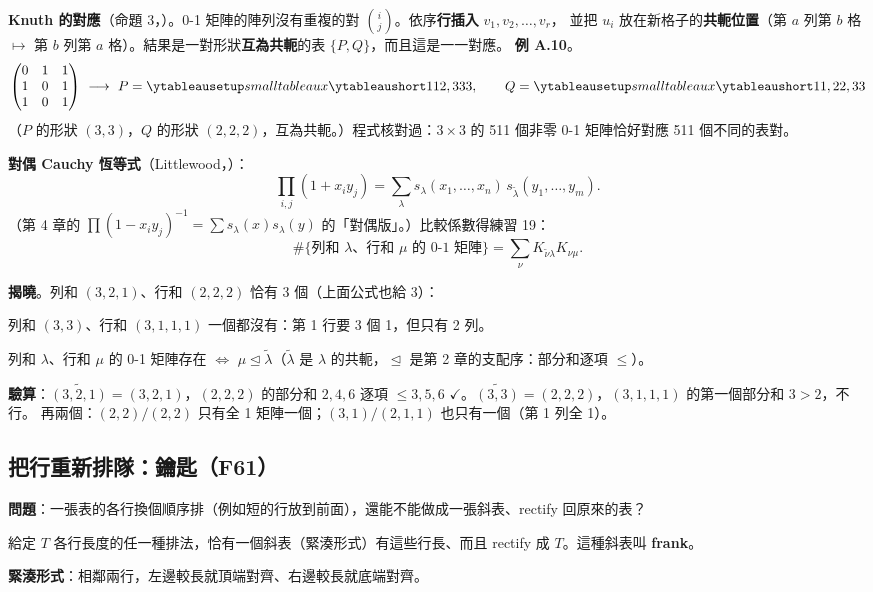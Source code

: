 \textbf{Knuth 的對應}（命題 3，）。0-1 矩陣的陣列沒有重複的對 $\binom ij$。依序\textbf{行插入} $v_1,v_2,\dots,v_r$，
並把 $u_i$ 放在新格子的\textbf{共軛位置}（第 $a$ 列第 $b$ 格 $\mapsto$ 第 $b$ 列第 $a$ 格）。結果是一對形狀\textbf{互為共軛}的表 $\{P,Q\}$，而且這是一一對應。
\textbf{例 A.10}。
\[
\begin{pmatrix}0&1&1\\1&0&1\\1&0&1\end{pmatrix}\ \longrightarrow\ P=\yts{112,333},\qquad Q=\yts{11,22,33}
\]
（$P$ 的形狀 $(3,3)$，$Q$ 的形狀 $(2,2,2)$，互為共軛。）程式核對過：$3\times3$ 的 511 個非零 0-1 矩陣恰好對應 511 個不同的表對。

\textbf{對偶 Cauchy 恆等式}（Littlewood，）：
\[
\prod_{i,j}(1+x_iy_j)=\sum_\lambda s_\lambda(x_1,\dots,x_n)\,s_{\tilde\lambda}(y_1,\dots,y_m).
\]
（第 4 章的 $\prod(1-x_iy_j)^{-1}=\sum s_\lambda(x)s_\lambda(y)$ 的「對偶版」。）比較係數得練習 19：
\[
\#\{\text{列和 }\lambda\text{、行和 }\mu\text{ 的 0-1 矩陣}\}=\sum_\nu K_{\tilde\nu\lambda}K_{\nu\mu}.
\]

\textbf{揭曉}。列和 $(3,2,1)$、行和 $(2,2,2)$ 恰有 3 個（上面公式也給 3）：
\begin{center}
\FulGaleRyser
\end{center}
列和 $(3,3)$、行和 $(3,1,1,1)$ 一個都沒有：第 1 行要 3 個 1，但只有 2 列。

\begin{thmbox}
列和 $\lambda$、行和 $\mu$ 的 0-1 矩陣存在 $\iff$ $\mu\trianglelefteq\tilde\lambda$（$\tilde\lambda$ 是 $\lambda$ 的共軛，$\trianglelefteq$ 是第 2 章的支配序：部分和逐項 $\le$）。
\end{thmbox}
\textbf{驗算}：$\widetilde{(3,2,1)}=(3,2,1)$，$(2,2,2)$ 的部分和 $2,4,6$ 逐項 $\le3,5,6$ $\checkmark$。$\widetilde{(3,3)}=(2,2,2)$，$(3,1,1,1)$ 的第一個部分和 $3>2$，不行。
再兩個：$(2,2)/(2,2)$ 只有全 1 矩陣一個；$(3,1)/(2,1,1)$ 也只有一個（第 1 列全 1）。

\subsection{把行重新排隊：鑰匙（F61）}\label{sec:f-keys}

\textbf{問題}：一張表的各行換個順序排（例如短的行放到前面），還能不能做成一張斜表、rectify 回原來的表？

\begin{thmbox}[命題 7 \fulref{p.208}]
給定 $T$ 各行長度的任一種排法，恰有一個斜表（緊湊形式）有這些行長、而且 rectify 成 $T$。這種斜表叫 \textbf{frank}。
\end{thmbox}
\textbf{緊湊形式}：相鄰兩行，左邊較長就頂端對齊、右邊較長就底端對齊。

